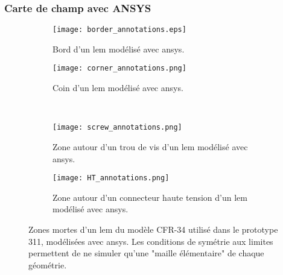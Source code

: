             \subsubsection{Carte de champ avec ANSYS}
                
                \begin{figure}[htbp]
                    \begin{subfigure}[t]{0.61\textwidth}
                        \texttt{[image: border\_annotations.eps]}
                        \caption[Bord d'un \gls{lem} modélisé avec \gls{ansys}.]{Bord d'un \gls{lem} modélisé avec \gls{ansys}.}
                        \label{fig::lem_border}
                    \end{subfigure}
                    \hfill
                    \begin{subfigure}[t]{0.31\textwidth}
                        \texttt{[image: corner\_annotations.png]}
                        \caption[Coin d'un \gls{lem} modélisé avec \gls{ansys}.]{Coin d'un \gls{lem} modélisé avec \gls{ansys}.}
                        \label{fig::corner}
                    \end{subfigure}\\
                    \begin{subfigure}[b]{0.42\textwidth}
                        \texttt{[image: screw\_annotations.png]}
                        \caption[Zone autour d'un trou de vis d'un \gls{lem} modélisé avec \gls{ansys}.]{Zone autour d'un trou de vis d'un \gls{lem} modélisé avec \gls{ansys}.}
                        \label{fig::screw}
                    \end{subfigure}
                    \hfill
                    \begin{subfigure}[b]{0.48\textwidth}
                        \texttt{[image: HT\_annotations.png]}
                        \caption[Zone autour d'un connecteur haute tension d'un \gls{lem} modélisé avec \gls{ansys}.]{Zone autour d'un connecteur haute tension d'un \gls{lem} modélisé avec \gls{ansys}.}
                        \label{fig::HT}
                    \end{subfigure}
                    \caption[Zones mortes d'un \gls{lem} modélisé avec \gls{ansys}.]{Zones mortes d'un \gls{lem} du modèle CFR-34 utilisé dans le prototype 311, modélisées avec \gls{ansys}. Les conditions de symétrie aux limites permettent de ne simuler qu'une "maille élémentaire" de chaque géométrie.}
                    \label{fig::zones_mortes}
                \end{figure}
            
